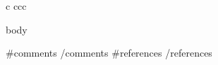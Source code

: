 \begin{deluxetable}{c ccc}

\tablewidth{0pc}



\startdata

{{{body}}}

\enddata

{{#comments}}
{{/comments}}
{{#references}}
{{/references}}

\end{deluxetable}
